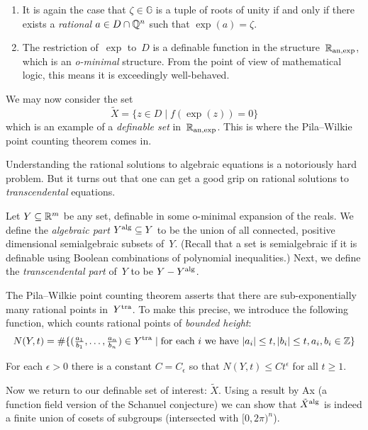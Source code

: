 \documentclass[10pt, a4paper]{amsart}
\begin{document}
\begin{enumerate}
  \item It is again the case that $\zeta \in \mathbb G$ is a tuple of roots of unity
    if and only if there exists a \emph{rational} $a \in D \cap \mathbb{Q}^n$ such that $\exp(a) = \zeta$.
  \item The restriction of~$\exp$ to~$D$ is a definable function in the structure~$\mathbb{R}_{\mathrm{an},\exp}$,
    which is an \emph{o-minimal} structure.
    From the point of view of mathematical logic, this means it is exceedingly well-behaved.
\end{enumerate}

We may now consider the set
\[ \tilde X = \{ z \in D \mid f(\exp(z)) = 0 \} \]
which is an example of a \emph{definable set} in~$\mathbb{R}_{\mathrm{an},\exp}$.
This is where the Pila--Wilkie point counting theorem comes in.

Understanding the rational solutions to algebraic equations is a notoriously hard problem.
But it turns out that one can get a good grip on rational solutions to \emph{transcendental} equations.

Let $Y \subseteq \mathbb{R}^m$ be any set, definable in some o-minimal expansion of the reals.
We define the \emph{algebraic part} $Y^{\mathrm{alg}} \subseteq Y$ to be
the union of all connected, positive dimensional semialgebraic subsets of~$Y$.
(Recall that a set is semialgebraic if it is definable using Boolean combinations of polynomial inequalities.)
Next, we define the \emph{transcendental part} of~$Y$ to be $Y - Y^{\mathrm{alg}}$.

The Pila--Wilkie point counting theorem asserts that there are sub-exponentially many rational points in~$Y^{\mathrm{tra}}$.
To make this precise, we introduce the following function,
which counts rational points of \emph{bounded height}:
\[
  N(Y,t) = \# \{ (\tfrac{a_1}{b_1}, \dots, \tfrac{a_n}{b_n}) \in Y^{\mathrm{tra}} \mid
  \text{for each $i$ we have }
  |a_i| \le t, |b_i| \le t, a_i, b_i \in \mathbb{Z} \}
\]

\begin{theorem}
  For each $\epsilon > 0$ there is a constant $C = C_\epsilon$
  so that $N(Y, t) \le Ct^\epsilon$ for all $t \ge 1$.
\end{theorem}

Now we return to our definable set of interest: $\tilde X$.
Using a result by Ax (a function field version of the Schanuel conjecture)
we can show that $\tilde X^{\mathrm{alg}}$ is indeed a finite union of cosets of subgroups
(intersected with $[0,2\pi)^n$).
\end{document}
